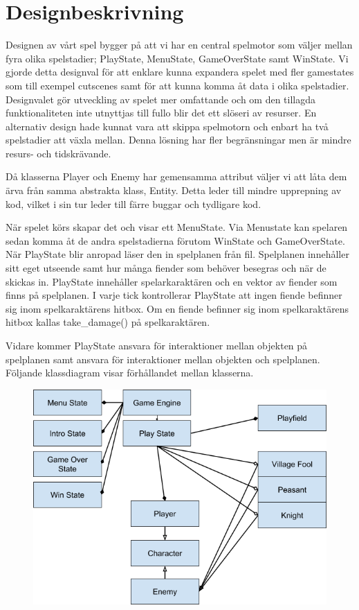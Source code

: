 \documentclass{TDP005mall}
\begin{document}
\section{Designbeskrivning}
Designen av vårt spel bygger på att vi har en central spelmotor som väljer mellan fyra olika spelstadier;
PlayState, MenuState, GameOverState samt WinState.
Vi gjorde detta designval för att enklare kunna expandera spelet med fler gamestates som till exempel cutscenes samt för att kunna komma åt data i olika spelstadier. 
Designvalet gör utveckling av spelet mer omfattande och om den tillagda funktionaliteten inte utnyttjas till fullo blir det ett slöseri av resurser.
En alternativ design hade kunnat vara att skippa spelmotorn och enbart ha två spelstadier att växla mellan.
Denna lösning har fler begränsningar men är mindre resurs- och tidskrävande.

Då klasserna Player och Enemy har gemensamma attribut väljer vi att låta dem ärva från samma abstrakta klass, Entity. 
Detta leder till mindre upprepning av kod, vilket i sin tur leder till färre buggar och tydligare kod.

När spelet körs skapar det och visar ett MenuState. 
Via Menustate kan spelaren sedan komma åt de andra spelstadierna förutom WinState och GameOverState.
När PlayState blir anropad läser den in spelplanen från fil. 
Spelplanen innehåller sitt eget utseende samt hur många fiender som behöver besegras och när de skickas in.
PlayState innehåller spelarkaraktären och en vektor av fiender som finns på spelplanen.
I varje tick kontrollerar PlayState att ingen fiende befinner sig inom spelkaraktärens hitbox. 
Om en fiende befinner sig inom spelkaraktärens hitbox kallas take\_damage() på spelkaraktären.

Vidare kommer PlayState ansvara för interaktioner mellan objekten på spelplanen samt ansvara för interaktioner mellan objekten och spelplanen.
\newpage
Följande klassdiagram visar förhållandet mellan klasserna.
\begin{figure}[h!]
    \includegraphics[width=\linewidth]{class_diagram.png}
\end{figure}
\end{document}
